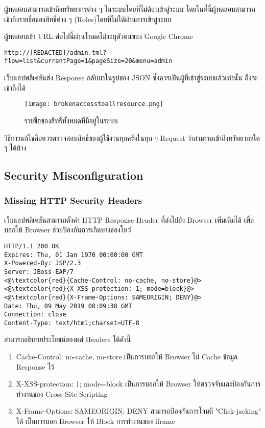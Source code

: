 ผู้ทดสอบสามารถเข้าถึงทรัพยากรต่าง ๆ ในระบบโดยที่ไม่ต้องเข้าสู่ระบบ โดยในที่นี้ผู้ทดสอบสามารถเข้าถึงรายชื่อของสิทธิ์ต่าง ๆ (Roles)โดยที่ไม่ได้ผ่านการเข้าสู่ระบบ

ผู้ทดสอบเข้า URL ต่อไปนี้ผ่านโหมดไม่ระบุตัวตนของ Google Chrome

\begin{lstlisting}[numbers=none] 
http://[REDACTED]/admin.tml?flow=list&currentPage=1&pageSize=20&menu=admin
\end{lstlisting}

เว็บแอปพลิเคชันส่ง Response กลับมาในรูปของ JSON ซึ่งควรเป็นผู้ที่เข้าสู่ระบบแล้วเท่านั้น ถึงจะเข้าถึงได้

 \begin{figure}[h]
	\centering
	\texttt{[image: brokenaccesstoallresource.png]}
	\caption{รายชื่อของสิทธิ์ทั้งหมดที่มีอยู่ในระบบ}
	\label{Fig:brokenaccesstoallresource.png}
\end{figure}

วิธีการแก้ไขคือควรตรวจสอบสิทธิ์ของผู้ใช้งานทุกครั้งในทุก ๆ Request ว่าสามารถเข้าถึงทรัพยากรใด ๆ ได้บ้าง

\subsection{Security Misconfiguration}

\subsubsection{Missing HTTP Security Headers}

 เว็บแอปพลิเคชันสามารถตั้งค่า HTTP Response Header ที่ส่งไปยัง Browser เพิ่มเติมได้ เพื่อบอกให้ Browser ช่วยป้องกันการเกิดบางช่องโหว่
 
 \begin{lstlisting}[numbers=none] 
HTTP/1.1 200 OK
Expires: Thu, 01 Jan 1970 00:00:00 GMT
X-Powered-By: JSP/2.3
Server: JBoss-EAP/7
<@\textcolor{red}{Cache-Control: no-cache, no-store}@>
<@\textcolor{red}{X-XSS-protection: 1; mode=block}@> 
<@\textcolor{red}{X-Frame-Options: SAMEORIGIN; DENY}@> 
Date: Thu, 09 May 2019 08:09:38 GMT
Connection: close
Content-Type: text/html;charset=UTF-8
 \end{lstlisting}
 
สามารถอธิบายประโยชน์ของแต่ Headers ได้ดังนี้

\begin{enumerate}
	\item Cache-Control: no-cache, no-store เป็นการบอกให้ Browser ไม่ Cache ข้อมูล Response ไว้
	\item X-XSS-protection: 1; mode=block เป็นการบอกให้ Browser ให้ตรวจจับและป้องกันการทำงานของ Cross-Site Scripting
	\item X-Frame-Options: SAMEORIGIN; DENY สามารถป้องกันการโจมตี "Click-jacking" \cite{} ได้ เป็นการบอก Browser ให้ Block การทำงานของ iframe
\end{enumerate}

